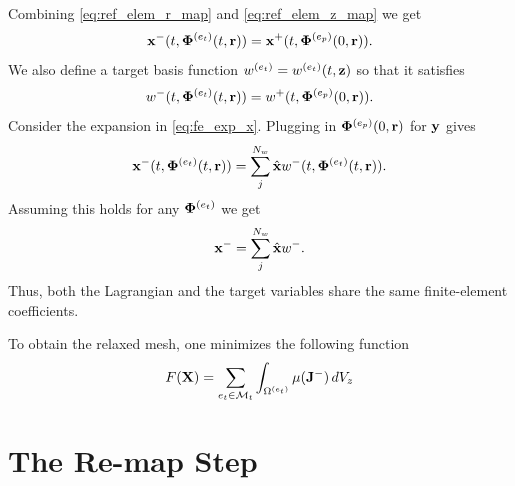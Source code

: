 \documentclass[11pt]{report}
\begin{document}
Combining \cref{eq:ref_elem_r_map} and \cref{eq:ref_elem_z_map} we get
\begin{equation}
    \mathbf{x}^-(t,\bm \Phi^{(e_t)}(t,\mathbf{r})) = \mathbf{x}^+(t, \bm \Phi^{(e_p)}(0,\mathbf{r})).
\end{equation}
We also define a target basis function $w^{(e_t)} = w^{(e_t)}(t,\mathbf{z})$ so that it satisfies
\begin{equation}
    w^-(t,\bm \Phi^{(e_t)}(t,\mathbf{r})) = w^+(t, \bm \Phi^{(e_p)}(0,\mathbf{r})).
\end{equation}
Consider the expansion in \cref{eq:fe_exp_x}. Plugging in $\bm \Phi^{(e_p)}(0,\mathbf{r})$ for $\mathbf{y}$ gives
\begin{equation*}
    \mathbf{x}^-(t,\bm \Phi^{(e_t)}(t,\mathbf{r})) = \sum_j^{N_w} \hat{\mathbf{x}} w^-(t,\bm \Phi^{(e_t)}(t,\mathbf{r})).
\end{equation*}
Assuming this holds for any $\bm \Phi^{(e_t)}$ we get
\begin{equation}
    \mathbf{x}^- = \sum_j^{N_w} \hat{\mathbf{x}} w^-.
\end{equation}
Thus, both the Lagrangian and the target variables share the same finite-element coefficients.

To obtain the relaxed mesh, one minimizes the following function
\begin{equation}
    F(\mathbf{X}) = \sum_{e_t \in \mathcal{M}_t} \int_{\Omega^{(e_t)}} \mu( \mathbf{J}^- ) \, dV_z
\end{equation}

\chapter{The Re-map Step}



\end{document}
